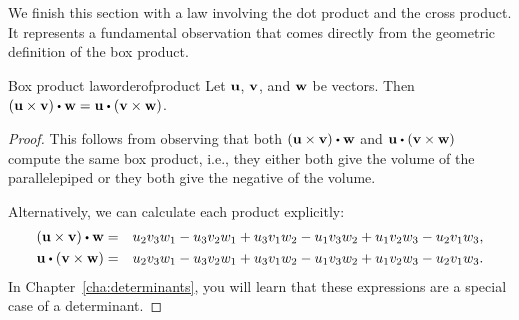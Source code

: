 We finish this section with a law involving the dot product and the
cross product. It represents a fundamental observation that comes
directly from the geometric definition of the box product. 

\begin{proposition}{Box product law}{orderofproduct}
  Let $\mbox{\bf u}$, $\mbox{\bf v}$, and $\mbox{\bf w}$ be vectors. Then
  $\tup{\vect{u}\times\vect{v}} \dotprod \vect{w}=\vect{u}\dotprod
  \tup{\vect{v}\times \vect{w}}$.
\end{proposition}

\begin{proof}
  This follows from observing that both
  $\tup{\vect{u}\times \vect{v}} \dotprod \vect{w}$ and
  $\vect{u}\dotprod \tup{\vect{v}\times \vect{w}}$ compute the same
  box product, i.e., they either both give the volume of the
  parallelepiped or they both give the negative of the volume.

  Alternatively, we can calculate each product explicitly:
  \begin{eqnarray*}
    \tup{\vect{u}\times \vect{v}} \dotprod \vect{w}
    &=&
        u_2v_3w_1 - u_3v_2w_1
      + u_3v_1w_2 - u_1v_3w_2
        + u_1v_2w_3 - u_2v_1w_3,\\
    \vect{u}\dotprod \tup{\vect{v}\times \vect{w}}
    &=&
        u_2v_3w_1 - u_3v_2w_1
      + u_3v_1w_2 - u_1v_3w_2
        + u_1v_2w_3 - u_2v_1w_3.
  \end{eqnarray*}
  In Chapter~\ref{cha:determinants}, you will learn that these
  expressions are a special case of a determinant. 
\end{proof}




